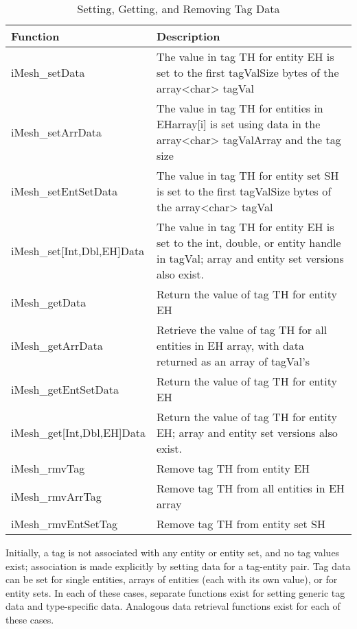 %
\begin{table}

\caption{Setting, Getting, and Removing Tag Data}

\label{table:Tags2} \begin{tabular}{|p{1.25in}|p{223pt}|}
\hline 
{\small Function}&
{\small Description}\tabularnewline
\hline
\hline 
{\small iMesh\_setData}&
{\small The value in tag TH for entity EH is set to the first tagValSize
bytes of the array\textless{}char\textgreater{} tagVal}\tabularnewline
\hline 
{\small iMesh\_setArrData}&
{\small The value in tag TH for entities in EHarray{[}i] is set using
data in the array\textless{}char\textgreater{} tagValArray and the
tag size}\tabularnewline
\hline 
{\small iMesh\_setEntSetData}&
{\small The value in tag TH for entity set SH is set to the first
tagValSize bytes of the array\textless{}char\textgreater{} tagVal}\tabularnewline
\hline 
{\small iMesh\_set{[}Int,Dbl,EH]Data}&
{\small The value in tag TH for entity EH is set to the int, double,
or entity handle in tagVal; array and entity set versions also exist.}\tabularnewline
\hline
\hline 
{\small iMesh\_getData}&
{\small Return the value of tag TH for entity EH}\tabularnewline
\hline 
{\small iMesh\_getArrData}&
{\small Retrieve the value of tag TH for all entities in EH array,
with data returned as an array of tagVal's}\tabularnewline
\hline 
{\small iMesh\_getEntSetData}&
{\small Return the value of tag TH for entity EH}\tabularnewline
\hline 
{\small iMesh\_get{[}Int,Dbl,EH]Data}&
{\small Return the value of tag TH for entity EH; array and entity
set versions also exist.}\tabularnewline
\hline
\hline 
{\small iMesh\_rmvTag}&
{\small Remove tag TH from entity EH}\tabularnewline
\hline 
{\small iMesh\_rmvArrTag}&
{\small Remove tag TH from all entities in EH array}\tabularnewline
\hline 
{\small iMesh\_rmvEntSetTag}&
{\small Remove tag TH from entity set SH}\tabularnewline
\hline
\end{tabular}
\end{table}


Initially, a tag is not associated with any entity or entity set,
and no tag values exist; association is made explicitly by setting
data for a tag-entity pair. Tag data can be set for single entities,
arrays of entities (each with its own value), or for entity sets.
In each of these cases, separate functions exist for setting generic
tag data and type-specific data. Analogous data retrieval functions
exist for each of these cases.


